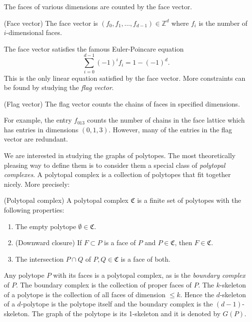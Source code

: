 The faces of various dimensions 
are counted by the face vector.
\begin{definition}
 (Face vector) The face vector is $(f_0, f_1, \dots, f_{d-1}) \in \mathbb{Z}^d$ 
where $f_i$ is 
the number of $i$-dimensional faces.
\end{definition}
The face vector satisfies the famous Euler-Poincare equation
\begin{equation}
 \sum_{i=0}^{d-1} (-1)^i f_i = 1 - (-1)^d.
\end{equation}
This is the only linear equation satisfied by the face vector. More 
constraints can be found by studying the \textit{flag vector}.

\begin{definition}
 (Flag vector) The flag vector counts the chains of faces in specified 
dimensions.
\end{definition}

For example, the entry $f_{013}$ counts the number of chains in the face 
lattice which has entries in dimensions $(0,1,3)$. However, many of the entries 
in the flag vector are redundant.

We are interested in studying the graphs of polytopes. The most theoretically 
pleasing way to define them is to consider them a special class of 
\textit{polytopal complexes}.
A polytopal complex is a collection of polytopes that fit together nicely.
More precisely:
\begin{definition}
 (Polytopal complex) A polytopal complex $\mathfrak{C}$ is a finite set of 
polytopes with the following properties:
\begin{enumerate}
 \item The empty polytope $\emptyset \in \mathfrak{C}$.
  \item (Downward closure) If $F \subset P$ is a face of $P$ and $P \in 
\mathfrak{C}$, then 
$F \in \mathfrak{C}$.
\item The intersection $P\cap Q$ of $P,Q \in \mathfrak{C}$ is a face of both.

\end{enumerate}

\end{definition}

Any polytope $P$ with its faces is a polytopal complex, as is the 
\textit{boundary complex} of 
$P$. The boundary complex is the collection of proper faces of $P$.
The $k$-skeleton of a polytope is the collection of all faces of dimension $\leq 
k$. Hence the $d$-skeleton of a $d$-polytope is the polytope itself and the 
boundary complex is the $(d-1)$-skeleton. The graph of the polytope is its 
1-skeleton and it is denoted by $G(P)$.

